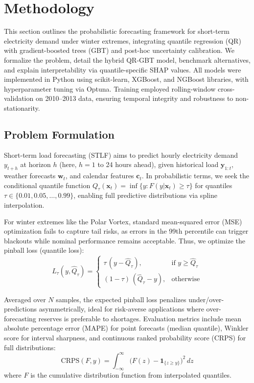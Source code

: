 \documentclass[12pt,a4paper]{article}
\begin{document}
\section{Methodology}
\label{sec:methodology}

This section outlines the probabilistic forecasting framework for short-term electricity demand under winter extremes, integrating quantile regression (QR) with gradient-boosted trees (GBT) and post-hoc uncertainty calibration. We formalize the problem, detail the hybrid QR-GBT model, benchmark alternatives, and explain interpretability via quantile-specific SHAP values. All models were implemented in Python using scikit-learn, XGBoost, and NGBoost libraries, with hyperparameter tuning via Optuna. Training employed rolling-window cross-validation on 2010--2013 data, ensuring temporal integrity and robustness to non-stationarity.

\subsection{Problem Formulation}

Short-term load forecasting (STLF) aims to predict hourly electricity demand $y_{t+h}$ at horizon $h$ (here, $h=1$ to 24 hours ahead), given historical load $\mathbf{y}_{1:t}$, weather forecasts $\mathbf{w}_t$, and calendar features $\mathbf{c}_t$. In probabilistic terms, we seek the conditional quantile function $Q_\tau(\mathbf{x}_t) = \inf\{y: F(y|\mathbf{x}_t) \geq \tau\}$ for quantiles $\tau \in \{0.01,0.05,\dots,0.99\}$, enabling full predictive distributions via spline interpolation.

For winter extremes like the Polar Vortex, standard mean-squared error (MSE) optimization fails to capture tail risks, as errors in the 99th percentile can trigger blackouts while nominal performance remains acceptable. Thus, we optimize the pinball loss (quantile loss):
\begin{equation}
    L_\tau(y, \hat{Q}_\tau) = 
    \begin{cases}
        \tau\,(y - \hat{Q}_\tau), & \text{if } y \geq \hat{Q}_\tau \\[4pt]
        (1-\tau)\,(\hat{Q}_\tau - y), & \text{otherwise}
    \end{cases}
    \label{eq:pinball}
\end{equation}

Averaged over $N$ samples, the expected pinball loss penalizes under/over-predictions asymmetrically, ideal for risk-averse applications where over-forecasting reserves is preferable to shortages. Evaluation metrics include mean absolute percentage error (MAPE) for point forecasts (median quantile), Winkler score for interval sharpness, and continuous ranked probability score (CRPS) for full distributions:
\begin{equation}
    \text{CRPS}(F, y) = \int_{-\infty}^{\infty} \bigl(F(z) - \mathbf{1}_{\{z \geq y\}}\bigr)^2 \, dz
    \label{eq:crps}
\end{equation}
where $F$ is the cumulative distribution function from interpolated quantiles.
\end{document}
